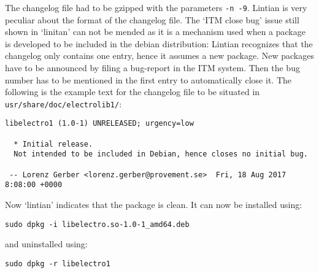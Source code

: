 \documentclass[a4paper,11pt,twoside]{article}
\begin{document}
The changelog file had to be gzipped with the parameters \verb+-n -9+. Lintian
is very peculiar about the format of the changelog file. The `ITM close bug'
issue still shown in `linitan'  can not be mended as it is a mechanism used
when a package is developed to be included in the debian distribution: Lintian
recognizes that the changelog only contains one entry, hence it assumes a new
package. New packages have to be announced by filing a bug-report in the ITM
system. Then the bug number has to be mentioned in the first entry to automatically
close it. The following is the example text for the changelog file to be situated
in \verb+usr/share/doc/electrolib1/+:
\begin{verbatim}
libelectro1 (1.0-1) UNRELEASED; urgency=low

  * Initial release.
  Not intended to be included in Debian, hence closes no initial bug.

 -- Lorenz Gerber <lorenz.gerber@provement.se>  Fri, 18 Aug 2017 8:08:00 +0000
\end{verbatim}
Now `lintian' indicates that the package is clean. It can now be installed using:
\begin{verbatim}
sudo dpkg -i libelectro.so-1.0-1_amd64.deb
\end{verbatim}
and uninstalled using:
\begin{verbatim}
sudo dpkg -r libelectro1
\end{verbatim}




\end{document}
